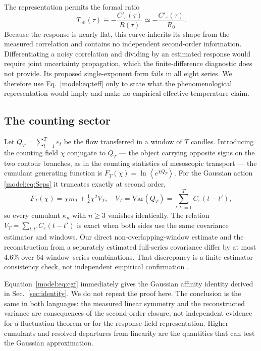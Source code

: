\documentclass[aps,pre,twocolumn,superscriptaddress,floatfix,nofootinbib]{revtex4-2}
\newcommand{\eps}{\varepsilon}
\newcommand{\avg}[1]{\left\langle #1 \right\rangle}
\newcommand{\Teff}{T_{\mathrm{eff}}}
\newcommand{\Var}{\mathrm{Var}}
\begin{document}
The representation permits the formal ratio
\begin{equation}
  \Teff(\tau)\equiv-\frac{C'_\eps(\tau)}{R(\tau)}
  \simeq-\frac{C'_\eps(\tau)}{R_0}.
  \label{model:eq:teff}
\end{equation}
Because the response is nearly flat, this curve inherits its shape from the
measured correlation and contains no independent second-order information.
Differentiating a noisy correlation and dividing by an estimated response
would require joint uncertainty propagation, which the finite-difference
diagnostic does not provide. Its proposed single-exponent form fails in all
eight series. We therefore use Eq.~\eqref{model:eq:teff} only to state what
the phenomenological representation would imply and make no empirical
effective-temperature claim.

\subsection{The counting sector}
\label{model:sec:counting}

Let $Q_T=\sum_{t=1}^{T}\eps_t$ be the flow transferred in a window of $T$
candles. Introducing the counting field $\chi$ conjugate to $Q_T$ --- the object
carrying opposite signs on the two contour branches, as in the counting
statistics of mesoscopic transport
\cite{levitov1993,levitov1996,schoenhammer2007,esposito2009} --- the cumulant
generating function is $F_T(\chi)=\ln\avg{e^{\chi Q_T}}$. For the Gaussian
action \eqref{model:eq:Seps} it truncates exactly at second order,
\begin{equation}
  F_T(\chi)=\chi m_T+\tfrac12\chi^2V_T ,
  \quad
  V_T=\Var(Q_T)=\!\!\sum_{t,t'=1}^{T}\!\!C_\eps(t-t') ,
  \label{model:eq:cgf}
\end{equation}
so every cumulant $\kappa_n$ with $n\ge3$ vanishes identically. The relation
$V_T=\sum_{t,t'}C_\eps(t-t')$ is exact when both sides use the same covariance
estimator and windows. Our direct non-overlapping-window estimate and the
reconstruction from a separately estimated full-series covariance differ by
at most $4.6\%$ over $64$ window--series combinations. That discrepancy is a
finite-estimator consistency check, not independent empirical confirmation
\cite{code_keldysh_finance}.

Equation~\eqref{model:eq:cgf} immediately gives the Gaussian affinity
identity derived in Sec.~\ref{sec:identity}. We do not repeat the proof here.
The conclusion is the same in both languages: the measured linear symmetry
and the reconstructed variance are consequences of the second-order closure,
not independent evidence for a fluctuation theorem or for the
response-field representation. Higher cumulants and resolved departures from
linearity are the quantities that can test the Gaussian approximation.
\end{document}
